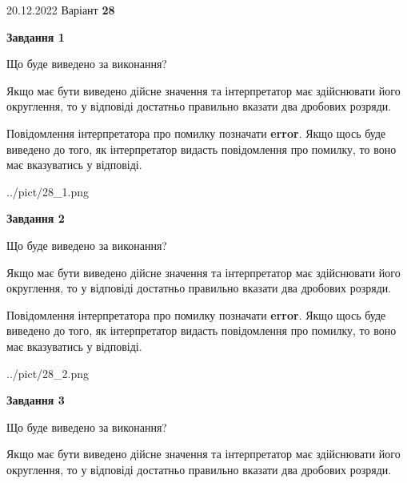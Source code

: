 \documentclass[12pt, ukrainian]{article}
\begin{document}
{20.12.2022 Варіант \No \textbf { 28 }\par}
{
\begin {Large}

{\begin {center}\textbf{Завдання 1}\end {center}}\par
Що буде виведено за виконання? \par

Якщо має бути виведено дійсне значення та інтерпретатор має здійснювати його округлення, 
то у відповіді достатньо правильно вказати два дробових розряди.

Повідомлення інтерпретатора про помилку позначати \textbf{error}.
Якщо щось буде виведено до того, як інтерпретатор видасть повідомлення про помилку, 
то воно має вказуватись у відповіді. \par

\begin{center}
	{../pict/28_1.png}
\end{center}
\newpage

{\begin {center}\textbf{Завдання 2}\end {center}}\par
Що буде виведено за виконання? \par

Якщо має бути виведено дійсне значення та інтерпретатор має здійснювати його округлення, 
то у відповіді достатньо правильно вказати два дробових розряди.

Повідомлення інтерпретатора про помилку позначати \textbf{error}.
Якщо щось буде виведено до того, як інтерпретатор видасть повідомлення про помилку, 
то воно має вказуватись у відповіді. \par

\begin{center}
	{../pict/28_2.png}
\end{center}
\newpage

{\begin {center}\textbf{Завдання 3}\end {center}}\par
Що буде виведено за виконання? \par

Якщо має бути виведено дійсне значення та інтерпретатор має здійснювати його округлення, 
то у відповіді достатньо правильно вказати два дробових розряди.


\end{Large}}
\end{document}
